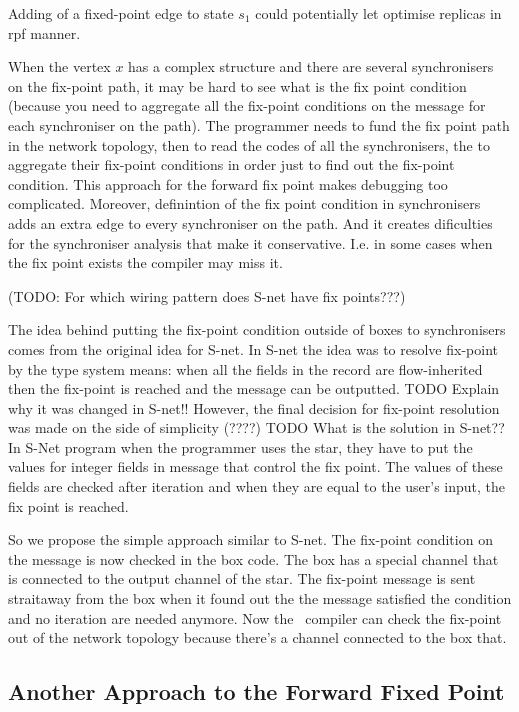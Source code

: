 Adding of a fixed-point edge to state $s_1$ could potentially let optimise replicas in rpf manner.


When the vertex $x$ has a complex structure and there are several synchronisers on the fix-point path, it may be hard to see what is the fix point condition (because you need to aggregate all the fix-point conditions on the message for each synchroniser on the path). The programmer needs to fund the fix point path in the network topology, then to read the codes of all the synchronisers, the to aggregate their fix-point conditions in order just to find out the fix-point condition. This approach for the forward fix point makes debugging too complicated. Moreover, definintion of the fix point condition in synchronisers adds an extra edge to every synchroniser on the path. And it creates dificulties for the synchroniser analysis that make it conservative. I.e. in some cases when the fix point exists the compiler may miss it.

(TODO: For which wiring pattern does S-net have fix points???)

The idea behind putting the fix-point condition outside of boxes to synchronisers comes from the original idea for S-net. In S-net the idea was to resolve fix-point by the type system means: when all the fields in the record are flow-inherited then the fix-point is reached and the message can be outputted. TODO Explain why it was changed in S-net!! However, the final decision for fix-point resolution was made on the side of simplicity (????) TODO What is the solution in S-net??
In S-Net program when the programmer uses the star, they have to put the values for integer fields in message that control the fix point. The values of these fields are checked after iteration and when they are equal to the user's input, the fix point is reached.

So we propose the simple approach similar to S-net. The fix-point condition on the message is now checked in the box code. The box has a special channel that is connected to the output channel of the star. The fix-point message is sent straitaway from the box when it found out the the message satisfied the condition and no iteration are needed anymore. Now the \ak\ compiler can check the fix-point out of the network topology because there's a channel connected to the box that.


    \subsection{Another Approach to the Forward Fixed Point}
%



